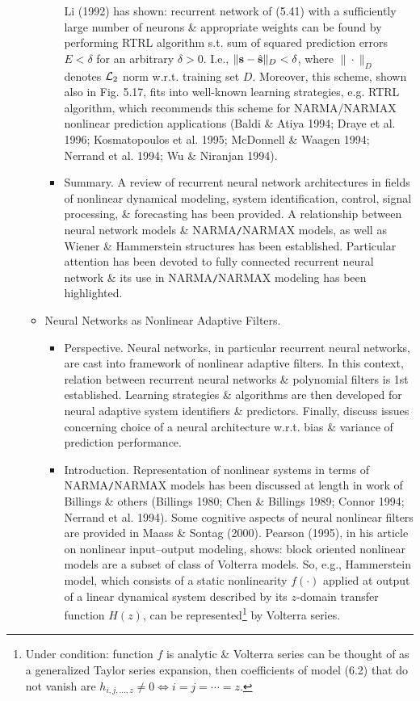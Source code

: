 \documentclass{article}
\begin{document}
\begin{enumerate}
\begin{itemize}
\begin{itemize}
			Li (1992) has shown: recurrent network of (5.41) with a sufficiently large number of neurons \& appropriate weights can be found by performing RTRL algorithm s.t. sum of squared prediction errors $E < \delta$ for an arbitrary $\delta > 0$. I.e., $\|{\bf s} - \hat{\bf s}\|_D < \delta$, where $\|\cdot\|_D$ denotes ${\cal L}_2$ norm w.r.t. training set $D$. Moreover, this scheme, shown also in Fig. 5.17, fits into well-known learning strategies, e.g. RTRL algorithm, which recommends this scheme for NARMA/NARMAX nonlinear prediction applications (Baldi \& Atiya 1994; Draye et al. 1996; Kosmatopoulos et al. 1995; McDonnell \& Waagen 1994; Nerrand et al. 1994; Wu \& Niranjan 1994).
			\item {\sf Summary.} A review of recurrent neural network architectures in fields of nonlinear dynamical modeling, system identification, control, signal processing, \& forecasting has been provided. A relationship between neural network models \& NARMA{\tt/}NARMAX models, as well as Wiener \& Hammerstein structures has been established. Particular attention has been devoted to fully connected recurrent neural network \& its use in NARMA{\tt/}NARMAX modeling has been highlighted.
		\end{itemize}
		\item {\sf Neural Networks as Nonlinear Adaptive Filters.}
		\begin{itemize}
			\item {\sf Perspective.} Neural networks, in particular recurrent neural networks, are cast into framework of nonlinear adaptive filters. In this context, relation between recurrent neural networks \& polynomial filters is 1st established. Learning strategies \& algorithms are then developed for neural adaptive system identifiers \& predictors. Finally, discuss issues concerning choice of a neural architecture w.r.t. bias \& variance of prediction performance.
			\item {\sf Introduction.} Representation of nonlinear systems in terms of NARMA{\tt/}NARMAX models has been discussed at length in work of Billings \& others (Billings 1980; Chen \& Billings 1989; Connor 1994; Nerrand et al. 1994). Some cognitive aspects of neural nonlinear filters are provided in Maass \& Sontag (2000). Pearson (1995), in his article on nonlinear input--output modeling, shows: block oriented nonlinear models are a subset of class of Volterra models. So, e.g., Hammerstein model, which consists of a static nonlinearity $f(\cdot)$ applied at output of a linear dynamical system described by its $z$-domain transfer function $H(z)$, can be represented\footnote{Under condition: function $f$ is analytic \& Volterra series can be thought of as a generalized Taylor series expansion, then coefficients of model (6.2) that do not vanish are $h_{i,j,\ldots,z}\ne0\Leftrightarrow i = j = \cdots = z$.} by Volterra series.
			

\end{itemize}
\end{itemize}
\end{enumerate}
\end{document}
